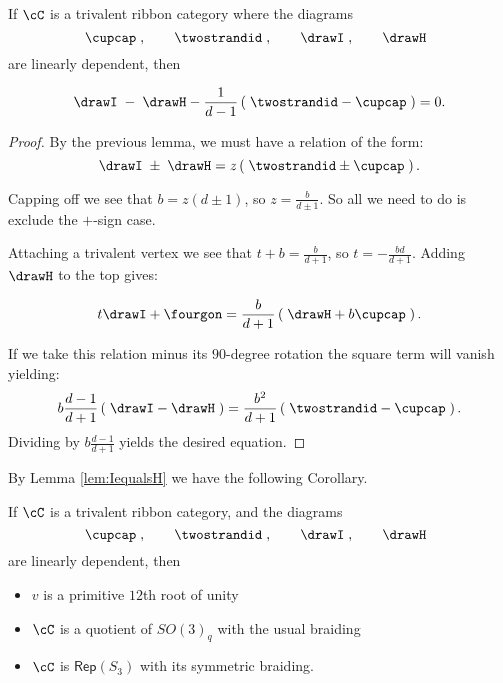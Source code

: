 \documentclass[12pt]{amsart}
\begin{document}
\begin{lemma}
If $\cC$ is a trivalent ribbon category where the diagrams   
  \[
  \cupcap\;,\qquad\twostrandid\;,
    \qquad\drawI\;,\qquad\drawH\;\;
   \]
are linearly dependent, then
 
$$\drawI\; - \; \drawH - \frac{1}{d-1} \left(\; \twostrandid - \cupcap \; \right) = 0.$$
\end{lemma}
\begin{proof}
By the previous lemma, we must have a relation of the form:
$$\drawI\;\pm \; \drawH = z \left(\; \twostrandid \pm \cupcap \;\right).$$

Capping off we see that $b= z (d \pm 1)$, so $z = \frac{b}{d \pm 1}$.  So all we need to do is exclude the $+$-sign case.

Attaching a trivalent vertex we see that $t + b = \frac{b}{d + 1}$, so $t =  -\frac{b d}{d + 1}$.  Adding $\drawH$ to the top gives:

$$t \drawI + \fourgon = \frac{b}{d+1} \left(\; \drawH + b \cupcap \; \right).$$

If we take this relation minus its $90$-degree rotation the square term will vanish yielding:
$$ b \frac{d-1}{d+1} \left(\; \drawI -\drawH \; \right) = \frac{b^2}{d+1} \left(\; \twostrandid - \cupcap \; \right).$$
Dividing by $b \frac{d-1}{d+1}$ yields the desired equation.
\end{proof}

By Lemma \ref{lem:IequalsH} we have the following Corollary.

\begin{corollary}
If $\cC$ is a trivalent ribbon category, and the diagrams   
  \[
  \cupcap\;,\qquad\twostrandid\;,
    \qquad\drawI\;,\qquad\drawH\;\;
   \]
are linearly dependent, then
\begin{itemize}
\item $v$ is a primitive $12$th root of unity
\item $\cC$ is a quotient of $SO(3)_q$ with the usual braiding
\item $\cC$ is $\mathsf{Rep}(S_3)$ with its symmetric braiding.
\end{itemize}
\end{corollary}
\end{document}
